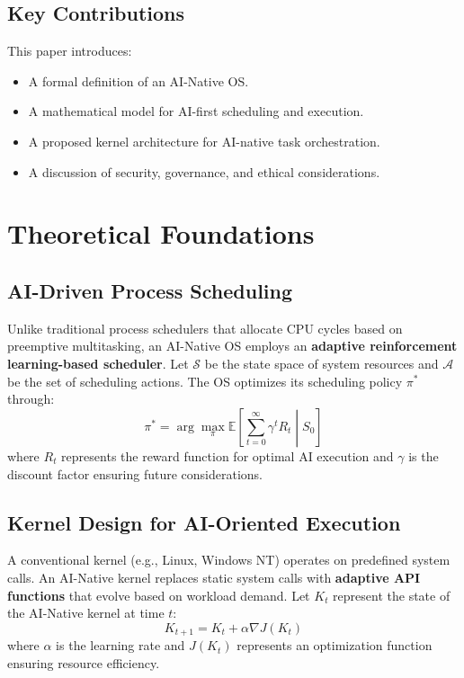 \documentclass{article}
\begin{document}
\subsection{Key Contributions}
This paper introduces:
\begin{itemize}
    \item A formal definition of an AI-Native OS.
    \item A mathematical model for AI-first scheduling and execution.
    \item A proposed kernel architecture for AI-native task orchestration.
    \item A discussion of security, governance, and ethical considerations.
\end{itemize}

\section{Theoretical Foundations}
\subsection{AI-Driven Process Scheduling}
Unlike traditional process schedulers that allocate CPU cycles based on preemptive multitasking, an AI-Native OS employs an \textbf{adaptive reinforcement learning-based scheduler}. Let $\mathcal{S}$ be the state space of system resources and $\mathcal{A}$ be the set of scheduling actions. The OS optimizes its scheduling policy $\pi^*$ through:
\begin{equation}
    \pi^* = \arg\max_{\pi} \mathbb{E} \left[ \sum_{t=0}^{\infty} \gamma^t R_t \middle| S_0 \right]
\end{equation}
where $R_t$ represents the reward function for optimal AI execution and $\gamma$ is the discount factor ensuring future considerations.

\subsection{Kernel Design for AI-Oriented Execution}
A conventional kernel (e.g., Linux, Windows NT) operates on predefined system calls. An AI-Native kernel replaces static system calls with \textbf{adaptive API functions} that evolve based on workload demand. Let $K_t$ represent the state of the AI-Native kernel at time $t$:
\begin{equation}
    K_{t+1} = K_t + \alpha \nabla J(K_t)
\end{equation}
where $\alpha$ is the learning rate and $J(K_t)$ represents an optimization function ensuring resource efficiency.
\end{document}
